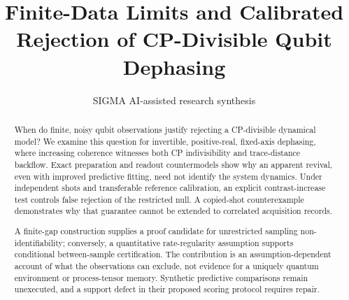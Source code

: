 \documentclass[11pt]{article}
\title{Finite-Data Limits and Calibrated Rejection of CP-Divisible Qubit Dephasing}
\date{}
\author{SIGMA AI-assisted research synthesis}
\begin{document}
\maketitle

\begin{abstract}
When do finite, noisy qubit observations justify rejecting a CP-divisible dynamical model? We examine this question for invertible, positive-real, fixed-axis dephasing, where increasing coherence witnesses both CP indivisibility and trace-distance backflow. Exact preparation and readout countermodels show why an apparent revival, even with improved predictive fitting, need not identify the system dynamics. Under independent shots and transferable reference calibration, an explicit contrast-increase test controls false rejection of the restricted null. A copied-shot counterexample demonstrates why that guarantee cannot be extended to correlated acquisition records.

A finite-gap construction supplies a proof candidate for unrestricted sampling non-identifiability; conversely, a quantitative rate-regularity assumption supports conditional between-sample certification. The contribution is an assumption-dependent account of what the observations can exclude, not evidence for a uniquely quantum environment or process-tensor memory. Synthetic predictive comparisons remain unexecuted, and a support defect in their proposed scoring protocol requires repair.
\end{abstract}
\begingroup\setlength{\fboxsep}{10pt}
\noindent{}\endgroup\par\medskip
\end{document}
